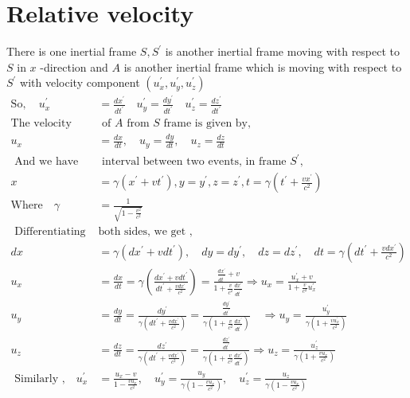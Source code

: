\section{Relative velocity}
There is one inertial frame $S, S^{\prime}$ is another inertial frame moving with respect to $S$ in
$x$ -direction and $A$ is another inertial frame which is moving with respect to $S^{\prime}$ with
velocity component $\left(u_{x}^{\prime}, u_{y}^{\prime}, u_{z}^{\prime}\right)$
\begin{align*}
\mathrm{So}, \quad u_{x}^{\prime}&=\frac{d x^{\prime}}{d t^{\prime}} \quad u_{y}^{\prime}=\frac{d y^{\prime}}{d t^{\prime}} \quad u_{z}^{\prime}=\frac{d z^{\prime}}{d t^{\prime}}\\
\text{The velocity component}&\text{ of $A$ from $S$ frame is given by,}\\
u_{x}&=\frac{d x}{d t}, \quad u_{y}=\frac{d y}{d t}, \quad u_{z}=\frac{d z}{d t}\\
\text{ And we  have time}&\text{ interval between two events, in frame ${S}^{\prime}$,}\\
x&=\gamma\left(x^{\prime}+v t^{\prime}\right), y=y^{\prime}, z=z^{\prime}, t=\gamma\left(t^{\prime}+\frac{v x^{\prime}}{c^{2}}\right)\\
\text{Where}\quad \gamma&=\frac{1}{\sqrt{1-\frac{v^{2}}{c^{2}}}}\\
\text { Differentiating }&\text{both sides, we get ,}\\
d x&=\gamma\left(d x^{\prime}+v d t^{\prime}\right), \quad d y=d y^{\prime}, \quad d z=d z^{\prime}, \quad d t=\gamma\left(d t^{\prime}+\frac{v d x^{\prime}}{c^{2}}\right)\\
u_{x}&=\frac{d x}{d t}=\gamma\left(\frac{d x^{\prime}+v d t^{\prime}}{d t^{\prime}+\frac{v d x^{\prime}}{c^{2}}}\right)=\frac{\frac{d x^{\prime}}{d t^{\prime}}+v}{1+\frac{v}{c^{2}} \frac{d x^{\prime}}{d t^{\prime}}} \Rightarrow u_{x}=\frac{u_{x}^{\prime}+v}{1+\frac{v}{c^{2}} u_{x}^{\prime}}\\
u_{y}&=\frac{d y}{d t}=\frac{d y^{\prime}}{\gamma\left(d t^{\prime}+\frac{v d x^{\prime}}{c^{2}}\right)}=\frac{\frac{d y^{\prime}}{d t^{\prime}}}{\gamma\left(1+\frac{v}{c^{2}} \frac{d x^{\prime}}{d t^{\prime}}\right)} \quad \Rightarrow u_{y}=\frac{u_{y}^{\prime}}{\gamma\left(1+\frac{v u_{x}^{\prime}}{c^{2}}\right)}\\
u_{z}&=\frac{d z}{d t}=\frac{d z^{\prime}}{\gamma\left(d t^{\prime}+\frac{v d x^{\prime}}{c^{2}}\right)}=\frac{\frac{d z^{\prime}}{d t^{\prime}}}{\gamma\left(1+\frac{v}{c^{2}} \frac{d x^{\prime}}{d t^{\prime}}\right)} \Rightarrow u_{z}=\frac{u_{z}^{\prime}}{\gamma\left(1+\frac{v u_{x}}{c^{2}}\right)}\\
\text { Similarly ,}\quad  u_{x}^{\prime}&=\frac{u_{x}-v}{1-\frac{v u_{x}}{c^{2}}}, \quad u_{y}^{\prime}=\frac{u_{y}}{\gamma\left(1-\frac{v u_{x}}{c^{2}}\right)}, \quad u_{z}^{\prime}=\frac{u_{z}}{\gamma\left(1-\frac{v u_{x}}{c^{2}}\right)}
\end{align*}
